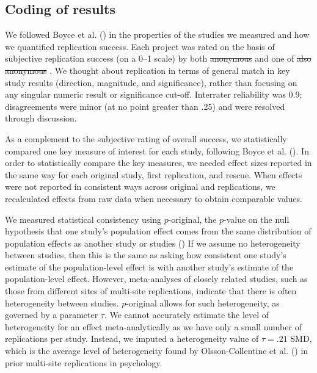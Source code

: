 \documentclass[
  english,
  a4paper,
]{article}
\providecommand{\DIFaddtex}[1]{{\protect\color{blue}\uwave{#1}}} %
\providecommand{\DIFdeltex}[1]{{\protect\color{red}\sout{#1}}}                      %
\providecommand{\DIFaddbegin}{} %
\providecommand{\DIFaddend}{} %
\providecommand{\DIFdelbegin}{} %
\providecommand{\DIFdelend}{} %
\providecommand{\DIFadd}[1]{\texorpdfstring{\DIFaddtex{#1}}{#1}} %
\providecommand{\DIFdel}[1]{\texorpdfstring{\DIFdeltex{#1}}{}} %
\newcommand{\DIFscaledelfig}{0.5}
\newlength{\DIFdelgraphicswidth} %
\newlength{\DIFdelgraphicsheight} %
\newcommand{\DIFaddincludegraphics}[2][]{{\color{blue}\fbox{\DIFOincludegraphics[#1]{#2}}}} %
\newcommand{\DIFdelincludegraphics}[2][]{%
\sbox{\DIFdelgraphicsbox}{\DIFOincludegraphics[#1]{#2}}%
\settoboxwidth{\DIFdelgraphicswidth}{\DIFdelgraphicsbox} %
\settoboxtotalheight{\DIFdelgraphicsheight}{\DIFdelgraphicsbox} %
\scalebox{\DIFscaledelfig}{%
\parbox[b]{\DIFdelgraphicswidth}{\usebox{\DIFdelgraphicsbox}\\[-\baselineskip] \rule{\DIFdelgraphicswidth}{0em}}\llap{\resizebox{\DIFdelgraphicswidth}{\DIFdelgraphicsheight}{%
\setlength{\unitlength}{\DIFdelgraphicswidth}%
\begin{picture}(1,1)%
\thicklines\linethickness{2pt} %
{\color[rgb]{1,0,0}\put(0,0){\framebox(1,1){}}}%
{\color[rgb]{1,0,0}\put(0,0){\line( 1,1){1}}}%
{\color[rgb]{1,0,0}\put(0,1){\line(1,-1){1}}}%
\end{picture}%
}\hspace*{3pt}}} %
} %
\DeclareRobustCommand{\DIFaddbegin}{\DIFOaddbegin \let\includegraphics\DIFaddincludegraphics} %
\DeclareRobustCommand{\DIFaddend}{\DIFOaddend \let\includegraphics\DIFOincludegraphics} %
\DeclareRobustCommand{\DIFdelbegin}{\DIFOdelbegin \let\includegraphics\DIFdelincludegraphics} %
\DeclareRobustCommand{\DIFdelend}{\DIFOaddend \let\includegraphics\DIFOincludegraphics} %
\begin{document}
\subsection{Coding of results}\label{coding-of-results}

We followed Boyce et al. () in the properties of the studies we measured and how we quantified replication success.
Each project was rated on the basis of subjective replication success (on a 0--1 scale) by both \DIFdelbegin %
\DIFdel{anonymous}%
\DIFdelend \DIFaddbegin \DIFadd{MCF }\DIFaddend and one of \DIFdelbegin %
\DIFdel{also anonymous}%
\DIFdelend \DIFaddbegin \DIFadd{VB and BP}\DIFaddend .
We thought about replication in terms of general match in key study results (direction, magnitude, and significance), rather than focusing on any singular numeric result or significance cut-off.
Interrater reliability was 0.9; disagreements were minor (at no point greater than .25) and were resolved through discussion.

As a complement to the subjective rating of overall success, we statistically compared one key measure of interest for each study, following Boyce et al. (). In order to statistically compare the key measures, we needed effect sizes reported in the same way for each original study, first replication, and rescue.
When effects were not reported in consistent ways across original and replications, we recalculated effects from raw data when necessary to obtain comparable values.

We measured statistical consistency using \(p\)-original, the \(p\)-value on the null hypothesis that one study's population effect comes from the same distribution of population effects as another study or studies () If we assume no heterogeneity between studies, then this is the same as asking how consistent one study's estimate of the population-level effect is with another study's estimate of the population-level effect.
However, meta-analyses of closely related studies, such as those from different sites of multi-site replications, indicate that there is often heterogeneity between studies.
\(p\)-original allows for such heterogeneity, as governed by a parameter \(\tau\).
We cannot accurately estimate the level of heterogeneity for an effect meta-analytically as we have only a small number of replications per study.
Instead, we imputed a heterogeneity value of \(\tau=.21\) SMD, which is the average level of heterogeneity found by Olsson-Collentine et al. () in prior multi-site replications in psychology.
\end{document}
